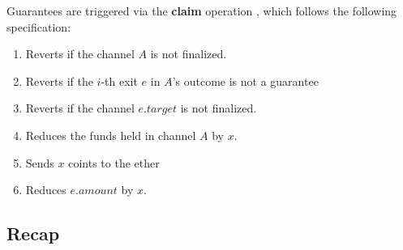 Guarantees are triggered via the \textbf{claim} operation , which follows the following specification:
\begin{enumerate}
  \item Reverts if the channel $A$ is not finalized.
  \item Reverts if the $i$-th exit $e$ in $A$'s outcome is not a guarantee
  \item Reverts if the channel $e.target$ is not finalized.
  \item Reduces the funds held in channel $A$ by $x$. 
  \item Sends $x$ coints to the ether
  \item Reduces $e.amount$ by $x$.
\end{enumerate} 


\subsection{Recap}

